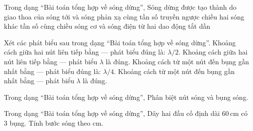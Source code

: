 \begin{ex}
Trong dạng “Bài toán tổng hợp về sóng dừng”, Sóng dừng được tạo thành do giao thoa của
\choice
{\True sóng tới và sóng phản xạ cùng tần số truyền ngược chiều}
{hai sóng khác tần số cùng chiều}
{sóng cơ và sóng điện từ}
{hai dao động tắt dần}
\end{ex}

\begin{ex}
Xét các phát biểu sau trong dạng “Bài toán tổng hợp về sóng dừng”.
\choiceTF
{\True Khoảng cách giữa hai nút liên tiếp bằng — phát biểu đúng là: $\lambda/2$.}
{Khoảng cách giữa hai nút liên tiếp bằng — phát biểu $\lambda$ là đúng.}
{\True Khoảng cách từ một nút đến bụng gần nhất bằng — phát biểu đúng là: $\lambda/4$.}
{Khoảng cách từ một nút đến bụng gần nhất bằng — phát biểu $\lambda$ là đúng.}
\end{ex}

\begin{ex}
Trong dạng “Bài toán tổng hợp về sóng dừng”, Phân biệt nút sóng và bụng sóng.
\choiceTF

\end{ex}

\begin{ex}
Trong dạng “Bài toán tổng hợp về sóng dừng”, Dây hai đầu cố định dài $60\,\text{cm}$ có 3 bụng. Tính bước sóng theo cm.
\end{ex}

